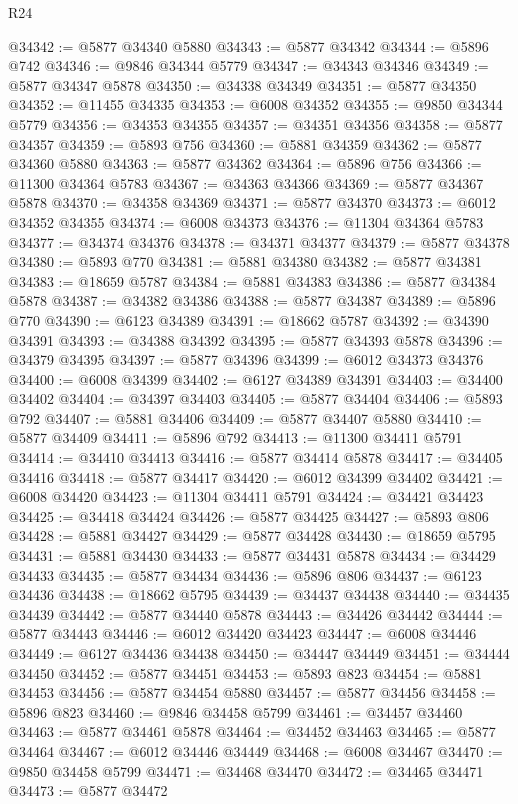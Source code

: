 \begin{lexlean}{R24}
\begin{coremodule}
@34342 := @5877 @34340 @5880
@34343 := @5877 @34342
@34344 := @5896 @742
@34346 := @9846 @34344 @5779
@34347 := @34343 @34346
@34349 := @5877 @34347 @5878
@34350 := @34338 @34349
@34351 := @5877 @34350
@34352 := @11455 @34335
@34353 := @6008 @34352
@34355 := @9850 @34344 @5779
@34356 := @34353 @34355
@34357 := @34351 @34356
@34358 := @5877 @34357
@34359 := @5893 @756
@34360 := @5881 @34359
@34362 := @5877 @34360 @5880
@34363 := @5877 @34362
@34364 := @5896 @756
@34366 := @11300 @34364 @5783
@34367 := @34363 @34366
@34369 := @5877 @34367 @5878
@34370 := @34358 @34369
@34371 := @5877 @34370
@34373 := @6012 @34352 @34355
@34374 := @6008 @34373
@34376 := @11304 @34364 @5783
@34377 := @34374 @34376
@34378 := @34371 @34377
@34379 := @5877 @34378
@34380 := @5893 @770
@34381 := @5881 @34380
@34382 := @5877 @34381
@34383 := @18659 @5787
@34384 := @5881 @34383
@34386 := @5877 @34384 @5878
@34387 := @34382 @34386
@34388 := @5877 @34387
@34389 := @5896 @770
@34390 := @6123 @34389
@34391 := @18662 @5787
@34392 := @34390 @34391
@34393 := @34388 @34392
@34395 := @5877 @34393 @5878
@34396 := @34379 @34395
@34397 := @5877 @34396
@34399 := @6012 @34373 @34376
@34400 := @6008 @34399
@34402 := @6127 @34389 @34391
@34403 := @34400 @34402
@34404 := @34397 @34403
@34405 := @5877 @34404
@34406 := @5893 @792
@34407 := @5881 @34406
@34409 := @5877 @34407 @5880
@34410 := @5877 @34409
@34411 := @5896 @792
@34413 := @11300 @34411 @5791
@34414 := @34410 @34413
@34416 := @5877 @34414 @5878
@34417 := @34405 @34416
@34418 := @5877 @34417
@34420 := @6012 @34399 @34402
@34421 := @6008 @34420
@34423 := @11304 @34411 @5791
@34424 := @34421 @34423
@34425 := @34418 @34424
@34426 := @5877 @34425
@34427 := @5893 @806
@34428 := @5881 @34427
@34429 := @5877 @34428
@34430 := @18659 @5795
@34431 := @5881 @34430
@34433 := @5877 @34431 @5878
@34434 := @34429 @34433
@34435 := @5877 @34434
@34436 := @5896 @806
@34437 := @6123 @34436
@34438 := @18662 @5795
@34439 := @34437 @34438
@34440 := @34435 @34439
@34442 := @5877 @34440 @5878
@34443 := @34426 @34442
@34444 := @5877 @34443
@34446 := @6012 @34420 @34423
@34447 := @6008 @34446
@34449 := @6127 @34436 @34438
@34450 := @34447 @34449
@34451 := @34444 @34450
@34452 := @5877 @34451
@34453 := @5893 @823
@34454 := @5881 @34453
@34456 := @5877 @34454 @5880
@34457 := @5877 @34456
@34458 := @5896 @823
@34460 := @9846 @34458 @5799
@34461 := @34457 @34460
@34463 := @5877 @34461 @5878
@34464 := @34452 @34463
@34465 := @5877 @34464
@34467 := @6012 @34446 @34449
@34468 := @6008 @34467
@34470 := @9850 @34458 @5799
@34471 := @34468 @34470
@34472 := @34465 @34471
@34473 := @5877 @34472

\end{coremodule}
\end{lexlean}

